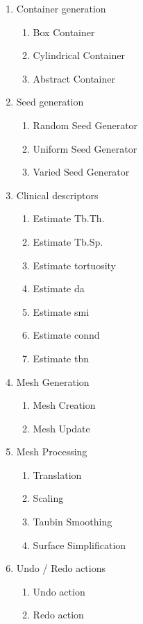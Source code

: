 \documentclass[11pt]{article}
\begin{document}
\renewcommand{\labelenumii}{\arabic{enumi}.\arabic{enumii}}
\renewcommand{\labelenumiii}{\arabic{enumi}.\arabic{enumii}.\arabic{enumiii}}
\renewcommand{\labelenumiv}{\arabic{enumi}.\arabic{enumii}.\arabic{enumiii}.\arabic{enumiv}}
\begin{enumerate}
    \item Container generation
    \begin{enumerate}
        \item Box Container
        \item Cylindrical Container
        \item Abstract Container
    \end{enumerate}
    \item Seed generation
    \begin{enumerate}
        \item Random Seed Generator
        \item Uniform Seed Generator
        \item Varied Seed Generator
    \end{enumerate}
    \item Clinical descriptors
    \begin{enumerate}
        \item Estimate Tb.Th.
        \item Estimate Tb.Sp.
        \item Estimate tortuosity
        \item Estimate \gls{da}
        \item Estimate \gls{smi}
        \item Estimate \gls{connd}
        \item Estimate \gls{tbn}
    \end{enumerate}
    \item Mesh Generation
    \begin{enumerate}
        \item Mesh Creation
        \item Mesh Update
    \end{enumerate}
    \item Mesh Processing
    \begin{enumerate}
        \item Translation
        \item Scaling
        \item Taubin Smoothing
        \item Surface Simplification
    \end{enumerate}
    \item Undo / Redo actions
    \begin{enumerate}
        \item Undo action
        \item Redo action
    \end{enumerate}
\end{enumerate}
\end{document}
